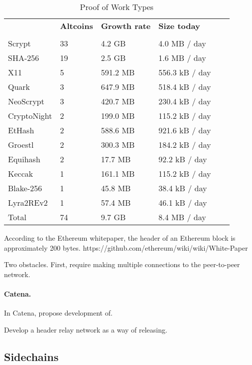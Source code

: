 \begin{table}
  \caption{Proof of Work Types}
  \begin{tabular}{l|ll|ll}
    & {\bf Altcoins} & {\bf Growth rate} & {\bf Size today} &  \\\\
    Scrypt  & 33  & 4.2 GB  & 4.0 MB / day \  \\
    SHA-256  & 19  & 2.5 GB  & 1.6 MB / day \  \\
    X11  & 5  & 591.2 MB  & 556.3 kB / day \  \\
    Quark  & 3  & 647.9 MB  & 518.4 kB / day \  \\
    NeoScrypt  & 3  & 420.7 MB  & 230.4 kB / day \  \\
    CryptoNight  & 2  & 199.0 MB  & 115.2 kB / day \  \\
    EtHash  & 2  & 588.6 MB  & 921.6 kB / day \  \\
    Groestl  & 2  & 300.3 MB  & 184.2 kB / day \  \\
    Equihash  & 2  & 17.7 MB  & 92.2 kB / day \  \\
    Keccak  & 1  & 161.1 MB  & 115.2 kB / day \  \\
    Blake-256  & 1  & 45.8 MB  & 38.4 kB / day \  \\
    Lyra2REv2  & 1  & 57.4 MB  & 46.1 kB / day \  \\
    \hline
    Total  & 74   &  9.7 GB  & 8.4 MB  / day  \\
  \end{tabular}
\end{table}

According to the Ethereum whitepaper, the header of an Ethereum block is approximately 200 bytes.
https://github.com/ethereum/wiki/wiki/White-Paper


Two obstacles. First, require making multiple connections to the peer-to-peer network.


\paragraph{Catena.}

In Catena, propose development of.

Develop a header relay network as a way of releasing.

\subsection{Sidechains}




